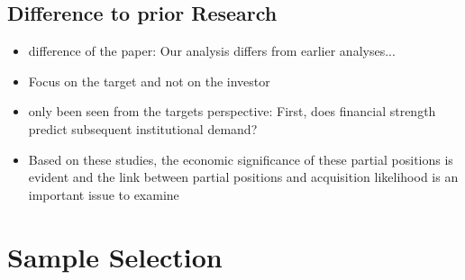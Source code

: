 \documentclass[12pt]{article}
\begin{document}
\subsection{Difference to prior Research}

    \begin{itemize}

        \item difference of the paper: Our analysis differs from earlier analyses...\citep{Brigida2012}

        \item Focus on the target and not on the investor 

        \item only been seen from the targets perspective: First, does financial strength predict subsequent institutional demand? \citep{Choi2012}

        \item Based on these studies, the economic significance of these partial positions is evident and the link between partial positions and acquisition likelihood is an important issue to examine \citep{Akhigbe2007}
    \end{itemize}

\section{Sample Selection}
\end{document}
